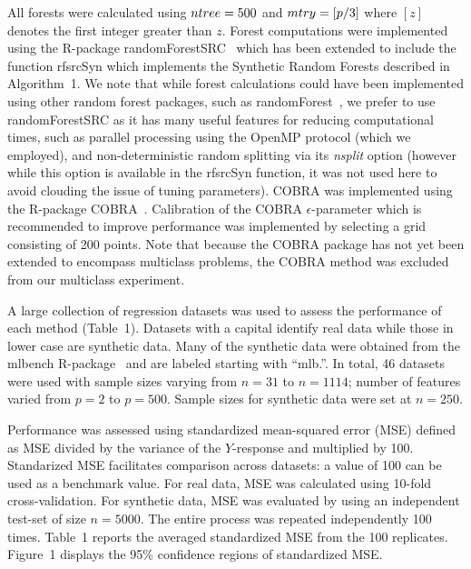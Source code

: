\documentclass{bmcart}
\def\mtry{{\sl mtry }}
\def\ntree{{\sl ntree }}
\def\nsplit{{\sl nsplit }}
\begin{document}
\vskip10pt
\noindent
All forests were calculated using $\ntree=500$ and $\mtry=[p/3]$ where
$[z]$ denotes the first integer greater than $z$.  Forest computations
were implemented using the R-package {\ttfamily
  randomForestSRC}~\cite{ishwaran:kogalur:2014} which has been
extended to include the function {\ttfamily rfsrcSyn} which implements
the Synthetic Random Forests described in Algorithm~1.  We note that
while forest calculations could have been implemented using other
random forest packages, such as {\ttfamily
  randomForest}~\cite{liaw2002classification}, we prefer to use
{\ttfamily randomForestSRC} as it has many useful features for
reducing computational times, such as parallel processing using the
OpenMP protocol (which we employed), and non-deterministic random
splitting via its \nsplit option (however while this option is
available in the {\ttfamily rfsrcSyn} function, it was not used here
to avoid clouding the issue of tuning parameters).  COBRA was
implemented using the R-package {\ttfamily COBRA}~\cite{guedj:2013}.
Calibration of the COBRA $\epsilon$-parameter which is recommended to
improve performance was implemented by selecting a grid consisting of
200 points.  Note that because the {\ttfamily COBRA} package has not
yet been extended to encompass multiclass problems, the COBRA method
was excluded from our multiclass experiment.

\vskip10pt

\noindent A large collection of regression datasets was used to assess the
performance of each method (Table~1).  Datasets with a capital
identify real data while those in lower case are synthetic data.
Many of the synthetic data were obtained from the {\ttfamily mlbench}
R-package~\cite{mlbench:2012} and are labeled starting with ``mlb.''.
In total, 46 datasets were used with sample sizes varying from $n=31$
to $n=1114$; number of features varied from $p=2$ to $p=500$.
Sample sizes for synthetic data were set at $n=250$.

Performance was assessed using standardized mean-squared error (MSE)
defined as MSE divided by the variance of the $Y$-response and
multiplied by 100.  Standarized MSE facilitates comparison across
datasets: a value of 100 can be used as a benchmark value.  For real
data, MSE was calculated using 10-fold cross-validation.  For
synthetic data, MSE was evaluated by using an independent test-set of
size $n=5000$.  The entire process was repeated independently 100 times.
Table~1 reports the averaged standardized MSE from the 100 replicates.
Figure~1 displays the 95\% confidence regions of standardized MSE.
\end{document}
